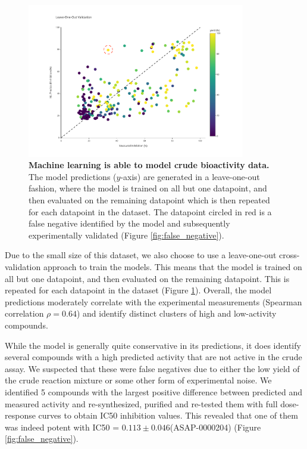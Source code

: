 \begin{figure}[!t]
 \centering
 \includegraphics[width=0.85\textwidth]{Chapters/Crude/Figs/rf_loo_flat.pdf}
 \caption{\textbf{Machine learning is able to model crude bioactivity data.} The model predictions ($y$-axis) are generated in a leave-one-out fashion, where the model is trained on all but one datapoint, and then evaluated on the remaining datapoint which is then repeated for each datapoint in the dataset. The datapoint circled in red is a false negative identified by the model and subsequently experimentally validated (Figure \ref{fig:false_negative}).}
 \label{fig:leave-one-out}
\end{figure}


Due to the small size of this dataset, we also choose to use a leave-one-out cross-validation approach to train the models. This means that the model is trained on all but one datapoint, and then evaluated on the remaining datapoint. This is repeated for each datapoint in the dataset (Figure \ref{fig:leave-one-out}). Overall, the model predictions moderately correlate with the experimental measurements (Spearman correlation $\rho =0.64$) and identify distinct clusters of high and low-activity compounds. 

While the model is generally quite conservative in its predictions, it does identify several compounds with a high predicted activity that are not active in the crude assay. We suspected that these were false negatives due to either the low yield of the crude reaction mixture or some other form of experimental noise. We identified 5 compounds with the largest positive difference between predicted and measured activity and re-synthesized, purified and re-tested them with full dose-response curves to obtain IC50 inhibition values. This revealed that one of them was indeed potent with IC50 = $0.113\pm0.046$\uM (ASAP-0000204) (Figure \ref{fig:false_negative}).

